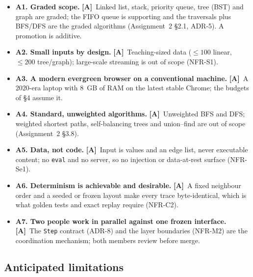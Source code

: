 \documentclass[11pt,a4paper]{article}
\newcommand{\A}{\textcolor{asmc}{\textbf{[A]}}}     %
\newcommand{\ct}[1]{\texttt{#1}}
\begin{document}
\begin{itemize}[leftmargin=1.4em,topsep=2pt,itemsep=1pt]
  \item \textbf{A1. Graded scope.} \A\ Linked list, stack, priority queue, tree (BST) and graph
        are graded; the FIFO queue is supporting and the traversals plus BFS/DFS are the graded
        algorithms (Assignment~2 \S2.1, ADR-5). A promotion is additive.
  \item \textbf{A2. Small inputs by design.} \A\ Teaching-sized data ($\le 100$ linear,
        $\le 200$ tree/graph); large-scale streaming is out of scope (NFR-S1).
  \item \textbf{A3. A modern evergreen browser on a conventional machine.} \A\ A 2020-era
        laptop with 8~GB of RAM on the latest stable Chrome; the budgets of \S4 assume it.
  \item \textbf{A4. Standard, unweighted algorithms.} \A\ Unweighted BFS and DFS; weighted
        shortest paths, self-balancing trees and union--find are out of scope (Assignment~2
        \S3.8).
  \item \textbf{A5. Data, not code.} \A\ Input is values and an edge list, never executable
        content; no \ct{eval} and no server, so no injection or data-at-rest surface
        (NFR-Se1).
  \item \textbf{A6. Determinism is achievable and desirable.} \A\ A fixed neighbour order and a
        seeded or frozen layout make every trace byte-identical, which is what golden tests and
        exact replay require (NFR-C2).
  \item \textbf{A7. Two people work in parallel against one frozen interface.} \A\ The
        \ct{Step} contract (ADR-8) and the layer boundaries (NFR-M2) are the coordination
        mechanism; both members review before merge.
\end{itemize}

\subsection{Anticipated limitations}
\end{document}
